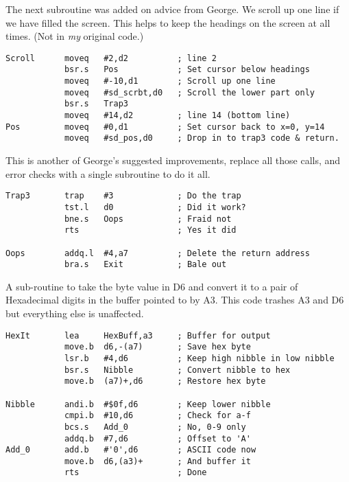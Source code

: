 The next subroutine was added on advice from George. We scroll up one line if we have filled the screen. This helps to keep the headings on the screen at all times. (Not in \emph{my} original code.)

\begin{lstlisting}[firstnumber=last,caption={Pointer Record Examiner - Scroll Screen}]
Scroll      moveq   #2,d2          ; line 2
            bsr.s   Pos            ; Set cursor below headings
            moveq   #-10,d1        ; Scroll up one line
            moveq   #sd_scrbt,d0   ; Scroll the lower part only
            bsr.s   Trap3
            moveq   #14,d2         ; line 14 (bottom line)
Pos         moveq   #0,d1          ; Set cursor back to x=0, y=14
            moveq   #sd_pos,d0     ; Drop in to trap3 code & return.
\end{lstlisting}

This is another of George's suggested improvements, replace all those  calls, and error checks with a single subroutine to do it all.

\begin{lstlisting}[firstnumber=last,caption={Pointer Record Examiner - Handle TRAPs}]
Trap3       trap    #3             ; Do the trap
            tst.l   d0             ; Did it work?
            bne.s   Oops           ; Fraid not
            rts                    ; Yes it did

Oops        addq.l  #4,a7          ; Delete the return address
            bra.s   Exit           ; Bale out
\end{lstlisting}

A sub-{}routine to take the byte value in D6 and convert it to a pair of Hexadecimal digits
in the buffer pointed to by A3. This code trashes A3 and D6 but everything else is
unaffected.

\begin{lstlisting}[firstnumber=last,caption={Pointer Record Examiner - Print Hexadecimal}]
HexIt       lea     HexBuff,a3     ; Buffer for output
            move.b  d6,-(a7)       ; Save hex byte
            lsr.b   #4,d6          ; Keep high nibble in low nibble
            bsr.s   Nibble         ; Convert nibble to hex
            move.b  (a7)+,d6       ; Restore hex byte

Nibble      andi.b  #$0f,d6        ; Keep lower nibble
            cmpi.b  #10,d6         ; Check for a-f
            bcs.s   Add_0          ; No, 0-9 only
            addq.b  #7,d6          ; Offset to 'A'
Add_0       add.b   #'0',d6        ; ASCII code now
            move.b  d6,(a3)+       ; And buffer it
            rts                    ; Done
\end{lstlisting}

